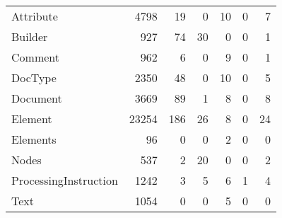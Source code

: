 \begin{tabular}{|l|r|r|r|r|r|r|}\hline
\typeHeading				& \successHeading & \failureHeading &\errorHeading &\successOnlyHeading	& \nonSuccessOnlyHeading 	& \mixedHeading\\\hline\hline
Attribute		& 4798	& 19	& 0	& 10	& 0	& 7\\\hline
Builder		& 927	& 74	& 30	& 0	& 0	& 1\\\hline
Comment		& 962	& 6	& 0	& 9	& 0	& 1\\\hline
DocType		& 2350	& 48	& 0	& 10	& 0	& 5\\\hline
Document		& 3669	& 89	& 1	& 8	& 0	& 8\\\hline
Element		& 23254	& 186	& 26	& 8	& 0	& 24\\\hline
Elements		& 96	& 0	& 0	& 2	& 0	& 0\\\hline
Nodes		& 537	& 2	& 20	& 0	& 0	& 2\\\hline
ProcessingInstruction		& 1242	& 3	& 5	& 6	& 1	& 4\\\hline
Text		& 1054	& 0	& 0	& 5	& 0	& 0\\\hline
\end{tabular}
